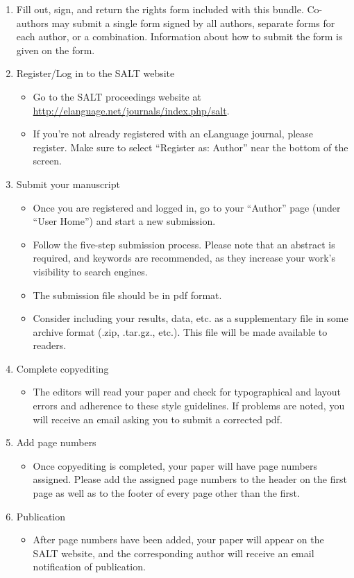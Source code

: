 \documentclass{salt}
\begin{document}
\begin{enumerate}[1. ]
  \item Fill out, sign, and return the rights form included with this bundle.  Co-authors may submit a single form signed by all authors, separate forms for each author, or a combination.  Information about how to submit the form is given on the form.
  \item Register/Log in to the SALT website
  \begin{itemize}
    \item Go to the SALT proceedings website at  \url{http://elanguage.net/journals/index.php/salt}.
    \item If you're not already registered with an eLanguage journal, please register.  Make sure to select ``Register as: Author'' near the bottom of the screen.
    \end{itemize}
  \item Submit your manuscript
    \begin{itemize}
      \item Once you are registered and logged in, go to your ``Author''  page (under ``User Home'') and start a new submission.
      \item Follow the five-step submission process.  Please note that an abstract is required, and keywords are recommended, as they increase your work's visibility to search engines.
      \item The submission file should be in pdf format.
      \item Consider including your results, data, etc. as a supplementary file in some archive format (.zip, .tar.gz., etc.).  This file will be made available to readers.
    \end{itemize}
    \item Complete copyediting
      \begin{itemize} 
      \item The editors will read your paper and check for typographical and layout errors and adherence to these style guidelines.  If problems are noted, you will receive an email asking you to submit a corrected pdf.
      \end{itemize}
     \item Add page numbers 
       \begin{itemize}
         \item Once copyediting is completed, your paper will have page numbers assigned.  Please add the assigned page numbers to the header on the first page as well as to the footer of every page other than the first.
       \end{itemize}  
     \item Publication 
       \begin{itemize}
         \item After page numbers have been added, your paper will appear on the SALT website, and the corresponding author will receive an email notification of publication.
        \end{itemize}
       
\end{enumerate}
     
\end{document}
